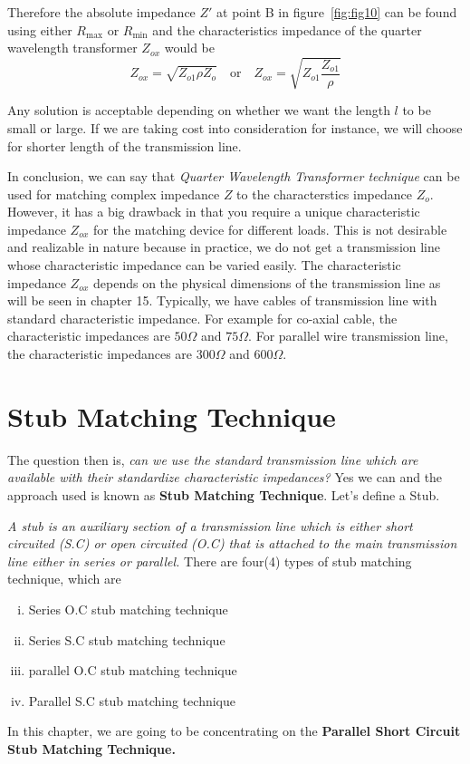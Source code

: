 Therefore the absolute impedance $Z'$ at point B in figure~\ref{fig:fig10} can be found using either $ R_\max$ or $ R_\min$ and the characteristics impedance of the quarter wavelength transformer $Z_{ox}$ would be
\begin{equation*}
Z_{ox}=\sqrt{Z_{o1}\rho Z_o}\quad\text{or}\quad Z_{ox}=\sqrt{Z_{o1}\frac{Z_{o1}}{\rho}}
\end{equation*}

Any solution is acceptable depending on whether we want the length $l$ to be small or large. If we are taking cost into consideration for instance, we will choose for shorter length of the transmission line.

In conclusion, we can say that \textit{Quarter Wavelength Transformer technique} can be used for matching complex impedance $Z$ to the characterstics impedance $Z_o$. However, it has a big drawback in that you require a unique characteristic impedance $Z_{ox}$ for the matching device for different loads. This is not desirable and realizable in nature because in practice, we do not get a transmission line whose characteristic impedance can be varied easily. The characteristic impedance $Z_{ox}$ depends on the physical dimensions of the transmission line as will be seen in chapter 15. Typically, we have cables of transmission line with standard characteristic impedance. For example for co-axial cable, the characteristic impedances are $50\Omega$ and $75\Omega$. For parallel wire transmission line, the characteristic impedances are $300\Omega$ and $600\Omega$.

\section{Stub Matching Technique}
The question then is, \emph{can we use the standard transmission line which are available with their standardize characteristic impedances?} Yes we can and the approach used is known as \textbf{Stub Matching Technique}. Let's define a Stub.

\emph{A stub is an auxiliary section of a transmission line which is either short circuited (S.C) or open circuited (O.C) that is attached to the main transmission line either in series or parallel.} There are four(4) types of stub matching technique, which are
\begin{enumerate}[(i)]
\item Series O.C stub matching technique
\item Series S.C stub matching technique
\item parallel O.C stub matching technique
\item Parallel S.C stub matching technique
\end{enumerate}
In this chapter, we are going to be concentrating on the \textbf{Parallel Short Circuit Stub Matching Technique.}

